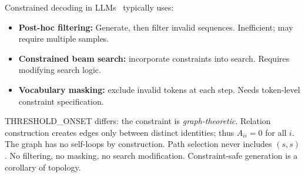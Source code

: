 Constrained decoding in LLMs~\cite{raffel2019t5} typically uses:
\begin{itemize}
\item \textbf{Post-hoc filtering:} Generate, then filter invalid sequences. Inefficient; may require multiple samples.
\item \textbf{Constrained beam search:} incorporate constraints into search. Requires modifying search logic.
\item \textbf{Vocabulary masking:} exclude invalid tokens at each step. Needs token-level constraint specification.
\end{itemize}

THRESHOLD\_ONSET differs: the constraint is \emph{graph-theoretic}. Relation construction creates edges only between distinct identities; thus $A_{ii} = 0$ for all $i$. The graph has no self-loops by construction. Path selection never includes $(s, s)$. No filtering, no masking, no search modification. Constraint-safe generation is a corollary of topology.
